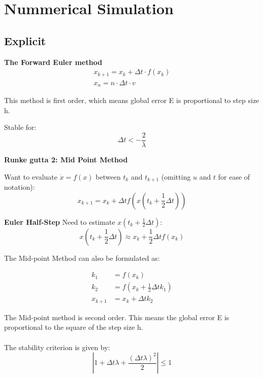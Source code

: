 \section{Nummerical Simulation}

\subsection{Explicit }

\textbf{The Forward Euler method}
\begin{subequations}
\begin{align}
    x_{k+1} = x_k + \Delta t \cdot f(x_k)\\
    x_n = n \cdot \Delta t \cdot v \label{eq:Euler}
\end{align}
\end{subequations}

This method is first order, which means global error E is proportional to step size h. 

Stable for: \[\Delta t < - \frac{2}{\lambda}\]

\textbf{Runke gutta 2: Mid Point Method }

Want to evaluate \(\dot{x} = f(x)\) between \(t_k\) and \(t_{k+1}\) (omitting \(u\) and \(t\) for ease of notation):
\begin{equation}
x_{k+1} = x_k + \Delta t f\left( x \left( t_k + \frac{1}{2} \Delta t \right) \right)
\end{equation}

\textbf{Euler Half-Step}
Need to estimate \(x \left( t_k + \frac{1}{2} \Delta t \right)\):
\begin{equation}
x \left( t_k + \frac{1}{2} \Delta t \right) \approx x_k + \frac{1}{2} \Delta t f(x_k)
\end{equation}

The Mid-point Method can also be formulated as:

\begin{align}
k_1 &= f(x_k) \\
k_2 &= f\left(x_k + \frac{1}{2} \Delta t k_1\right) \\
x_{k+1} &= x_k + \Delta t k_2
\end{align}

The Mid-point method is second order.  This means the global error E is proportional to the square of the step size h.
\\
\\
The stability criterion is given by:
\begin{equation}
\left| 1 + \Delta t \lambda + \frac{(\Delta t \lambda)^2}{2} \right| \leq 1
\end{equation}

